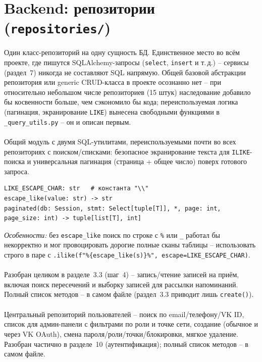 \section{Backend: репозитории (\texttt{repositories/})}

Один класс-репозиторий на одну сущность БД. Единственное место во всём
проекте, где пишутся SQLAlchemy-запросы (\texttt{select}, \texttt{insert}
и т.\,д.) -- сервисы (раздел~7) никогда не составляют SQL напрямую. Общей
базовой абстракции репозитория или generic CRUD-класса в проекте
осознанно нет -- при относительно небольшом числе репозиториев (15 штук)
наследование добавило бы косвенности больше, чем сэкономило бы кода;
переиспользуемая логика (пагинация, экранирование \texttt{LIKE})
вынесена свободными функциями в \texttt{_query_utils.py} -- он и
описан первым.

\paragraph{}
Общий модуль с двумя SQL-утилитами, переиспользуемыми почти во всех
репозиториях с поиском/списками: безопасное экранирование текста для
\texttt{ILIKE}-поиска и универсальная пагинация (страница + общее число)
поверх готового запроса.
\begin{verbatim}
LIKE_ESCAPE_CHAR: str   # константа "\\"
escape_like(value: str) -> str
paginated(db: Session, stmt: Select[tuple[T]], *, page: int, page_size: int) -> tuple[list[T], int]
\end{verbatim}
\textit{Особенности:} без \texttt{escape_like} поиск по строке с
\texttt{\%} или \texttt{_} работал бы некорректно и мог провоцировать
дорогие полные сканы таблицы -- использовать строго в паре с
\texttt{.ilike(f"\%\{escape_like(s)\}\%", escape=LIKE_ESCAPE_CHAR)}.

\paragraph{}
Разобран целиком в разделе~3.3 (шаг~4) -- запись/чтение записей на приём,
включая поиск пересечений и выборку записей для рассылки напоминаний.
Полный список методов -- в самом файле (раздел~3.3 приводит лишь
\texttt{create()}).

\paragraph{}
Центральный репозиторий пользователей -- поиск по email/телефону/VK ID,
список для админ-панели с фильтрами по роли и точке сети, создание
(обычное и через VK OAuth), смена пароля/роли/точки/блокировки, мягкое
удаление. Разобран частично в разделе~10 (аутентификация); полный список
методов -- в самом файле.

